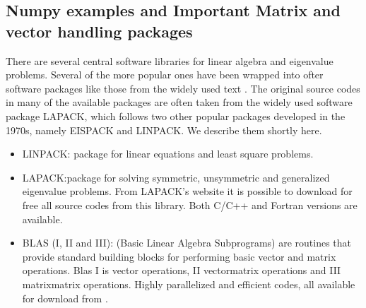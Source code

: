 \documentclass[letterpaper,10pt,english]{sphinxmanual}
\begin{document}
\subsection{Numpy examples and Important Matrix and vector handling packages}
\label{\detokenize{chapter3:numpy-examples-and-important-matrix-and-vector-handling-packages}}
There are several central software libraries for linear algebra and eigenvalue problems. Several of the more
popular ones have been wrapped into ofter software packages like those from the widely used text . The original source codes in many of the available packages are often taken from the widely used
software package LAPACK, which follows two other popular packages
developed in the 1970s, namely EISPACK and LINPACK.  We describe them shortly here.
\begin{itemize}
\item {} 
LINPACK: package for linear equations and least square problems.

\item {} 
LAPACK:package for solving symmetric, unsymmetric and generalized eigenvalue problems. From LAPACK’s website  it is possible to download for free all source codes from this library. Both C/C++ and Fortran versions are available.

\item {} 
BLAS (I, II and III): (Basic Linear Algebra Subprograms) are routines that provide standard building blocks for performing basic vector and matrix operations. Blas I is vector operations, II vector\sphinxhyphen{}matrix operations and III matrix\sphinxhyphen{}matrix operations. Highly parallelized and efficient codes, all available for download from .

\end{itemize}
\end{document}

